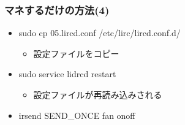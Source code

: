 \begin{frame}
    \frametitle{マネするだけの方法(4)}
    \begin{itemize}
        \item sudo cp 05.lircd.conf /etc/lirc/lircd.conf.d/
        \begin{itemize}
            \item 設定ファイルをコピー
        \end{itemize}
        \item sudo service lidrcd restart
        \begin{itemize}
            \item 設定ファイルが再読み込みされる
        \end{itemize}
        \item irsend SEND\_ONCE \color{red}fan onoff\color{black}
    \end{itemize}
\end{frame}